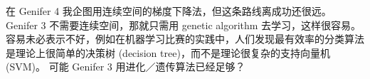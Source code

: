 \documentclass[12pt]{article}
\newcommand{\english}[1]{\rmfamily \textit{``#1''}\rmfamily}
\begin{document}
在 Genifer 4 我企图用连续空间的梯度下降法，但这条路线离成功还很远。  Genifer 3 不需要连续空间，那就只需用 genetic algorithm 去学习，这样很容易。 容易未必表示不好，例如在机器学习比赛的实践中，人们发现最有效率的分类算法是理论上很简单的决策树 (decision tree)，而不是理论很复杂的支持向量机 (SVM)。 可能 Genifer 3 用进化／遗传算法已经足够？

\end{document}
